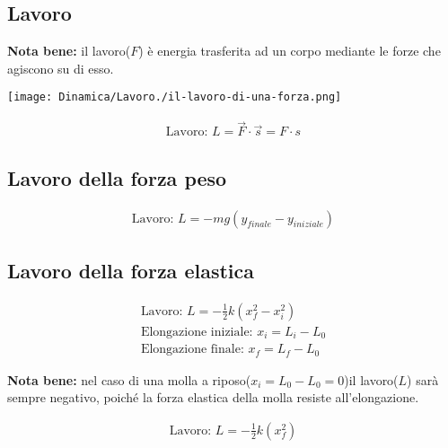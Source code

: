 \subsection{Lavoro}

\textbf{Nota bene: } il lavoro($F$) è energia trasferita ad un corpo mediante le forze che agiscono su di esso. \\
\begin{center}
    \texttt{[image: Dinamica/Lavoro./il-lavoro-di-una-forza.png]}    
\end{center}
\begin{gather*}
    \text{Lavoro: } L = \vec{F} \cdot \vec{s} = F \cdot  s
\end{gather*}

\subsection{Lavoro della forza peso}

\begin{gather*}
    \text{Lavoro: } L = -mg(y_{finale} - y_{iniziale})
\end{gather*}

\subsection{Lavoro della forza elastica}

\begin{gather*}
    \text{Lavoro: } L = - \frac{1}{2} k (x_f^2 - x_i^2) \\
    \text{Elongazione iniziale: } x_i = L_i - L_0 \\
    \text{Elongazione finale: } x_f = L_f - L_0
\end{gather*}

\textbf{Nota bene: } nel caso di una molla a riposo($x_i = L_0 - L_0 = 0$)il lavoro($L$) sarà sempre negativo, poiché la forza elastica della molla resiste all'elongazione.

\begin{gather*}
    \text{Lavoro: } L = - \frac{1}{2} k (x_f^2)
\end{gather*}